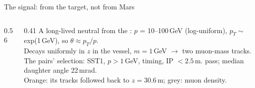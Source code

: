 \documentclass[aspectratio=169,10pt]{beamer}
\begin{document}
\begin{frame}{The signal: from the target, not from Mars}
  \begin{columns}[c]
    \begin{column}{0.56\textwidth}
    \end{column}
    \begin{column}{0.41\textwidth}\footnotesize
      A long-lived neutral from the : $p$ = 10--100\,GeV (log-uniform), $p_T\sim$ exp(1\,GeV), so $\theta\approx p_T/p$.\\[1mm]
      Decays uniformly in $z$ in the vessel, $m = 1$\,GeV $\to$ two muon-mass tracks.\\[1mm]
      The pairs' selection: SST1, $p>1$\,GeV, timing, IP $<2.5$\,m.  pass; median daughter angle 22\,mrad.\\[1mm]
      Orange: its tracks followed back to $z = 30.6$\,m; grey: muon density.\\[1mm]
    \end{column}
  \end{columns}
\end{frame}
\end{document}
